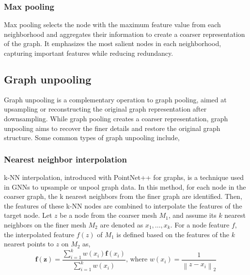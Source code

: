 \subsubsection{Max pooling} Max pooling selects the node with the maximum feature value from each neighborhood and aggregates their information to create a coarser representation of the graph. It emphasizes the most salient nodes in each neighborhood, capturing important features while reducing redundancy.
\subsection{Graph unpooling}
Graph unpooling is a complementary operation to graph pooling, aimed at upsampling or reconstructing the original graph representation after downsampling. While graph pooling creates a coarser representation, graph unpooling aims to recover the finer details and restore the original graph structure. Some common types of graph unpooling include,
\subsubsection{Nearest neighbor interpolation} 
\gls{k-NN} interpolation, introduced with PointNet++ \cite{pnpp} for graphs, is a technique used in GNNs to upsample or unpool graph data. In this method, for each node in the coarser graph, the k nearest neighbors from the finer graph are identified. Then, the features of these k-NN nodes are combined to interpolate the features of the target node. Let \(z\) be a node from the coarser mesh \(M_1\), and assume its \(k\) nearest neighbors on the finer mesh \(M_2\) are denoted as \(x_1, \ldots, x_k\). For a node feature \(f\), the interpolated feature \(f(z)\) of \(M_1\) is defined based on the features of the $k$ nearest points to $z$ on \(M_2\) as,
\begin{equation}
  \mathbf{f}(\mathbf{z})=\frac{\sum_{i=1}^k w\left(x_i\right) \mathbf{f}\left(x_i\right)}{\sum_{i=1}^k w\left(x_i\right)} \text {, where } w\left(x_i\right)=\frac{1}{\left\|z-x_i\right\|_2}
  \end{equation}
